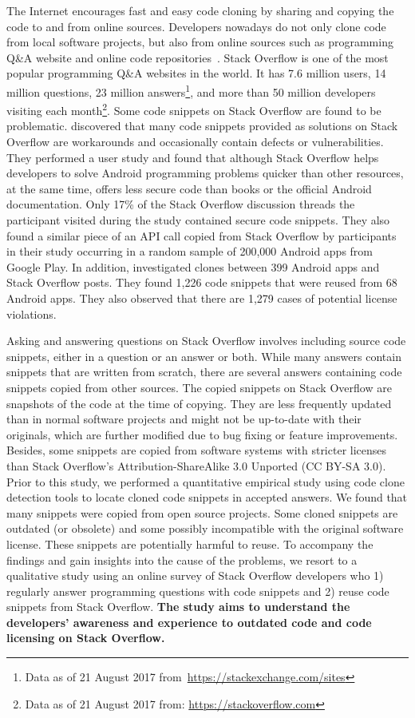 \documentclass{svjour3}                     %
\begin{document}
The Internet encourages fast and easy code cloning by sharing and copying the
code to and from online sources. Developers nowadays do not only clone code from
local software projects, but also from online sources such as programming Q\&A
website and online code
repositories~\citep{Acar2016,Abdalkareem2017,An2017,Yang2017}. Stack Overflow is
one of the most popular programming Q\&A websites in the world. It has 7.6
million users, 14 million questions, 23 million answers\footnote{Data as of 21
	August 2017 from~\url{https://stackexchange.com/sites}}, and more than 50
million developers visiting each month\footnote{Data as of 21 August 2017 from:
	\url{https://stackoverflow.com}}. Some code snippets on Stack Overflow are found
to be problematic. \cite{Acar2016} discovered that many code snippets provided
as solutions on Stack Overflow are workarounds and occasionally contain defects
or vulnerabilities. They performed a user study and found that although Stack
Overflow helps developers to solve Android programming problems quicker than
other resources, at the same time, offers less secure code than books or the
official Android documentation. Only 17\% of the Stack Overflow discussion
threads the participant visited during the study contained secure code snippets.
They also found a similar piece of an API call copied from Stack Overflow by
participants in their study occurring in a random sample of 200,000 Android apps
from Google Play. In addition, \cite{An2017} investigated clones between 399
Android apps and Stack Overflow posts. They found 1,226 code snippets that were
reused from 68 Android apps. They also observed that there are 1,279 cases of
potential license violations.

Asking and answering questions on Stack Overflow involves including source code
snippets, either in a question or an answer or both. While many answers contain
snippets that are written from scratch, there are several answers containing
code snippets copied from other sources. The copied snippets on Stack Overflow
are snapshots of the code at the time of copying. They are less frequently
updated than in normal software projects and might not be up-to-date with their
originals, which are further modified due to bug fixing or feature improvements.
Besides, some snippets are copied from software systems with stricter licenses
than Stack Overflow's Attribution-ShareAlike 3.0 Unported (CC BY-SA 3.0). Prior
to this study, we performed a quantitative empirical study using code clone
detection tools to locate cloned code snippets in accepted answers. We found
that many snippets were copied from open source projects. Some cloned snippets
are outdated (or obsolete) and some possibly incompatible with the original software
license. These snippets are potentially harmful to reuse. To accompany the
findings and gain insights into the cause of the problems, we resort to a
qualitative study using an online survey of Stack Overflow developers who 1)
regularly answer programming questions with code snippets and 2) reuse code
snippets from Stack Overflow. \textbf{The study aims to understand the
	developers' awareness and experience to outdated code and code licensing on
	Stack Overflow.}
\end{document}
